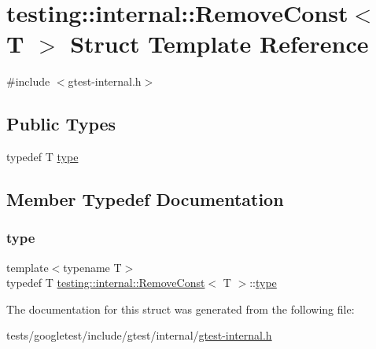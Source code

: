 \hypertarget{structtesting_1_1internal_1_1RemoveConst}{}\section{testing\+:\+:internal\+:\+:Remove\+Const$<$ T $>$ Struct Template Reference}
\label{structtesting_1_1internal_1_1RemoveConst}


{\ttfamily \#include $<$gtest-\/internal.\+h$>$}

\subsection*{Public Types}
\begin{DoxyCompactItemize}
\item 
typedef T \hyperlink{structtesting_1_1internal_1_1RemoveConst_a1be32027ea4edcc0d15abd59aba4a97f}{type}
\end{DoxyCompactItemize}


\subsection{Member Typedef Documentation}
\mbox{\label{structtesting_1_1internal_1_1RemoveConst_a1be32027ea4edcc0d15abd59aba4a97f}} 
\subsubsection{\texorpdfstring{type}{type}}
{\footnotesize\ttfamily template$<$typename T$>$ \\
typedef T \hyperlink{structtesting_1_1internal_1_1RemoveConst}{testing\+::internal\+::\+Remove\+Const}$<$ T $>$\+::\hyperlink{structtesting_1_1internal_1_1RemoveConst_a1be32027ea4edcc0d15abd59aba4a97f}{type}}



The documentation for this struct was generated from the following file\+:\begin{DoxyCompactItemize}
\item 
tests/googletest/include/gtest/internal/\hyperlink{gtest-internal_8h}{gtest-\/internal.\+h}\end{DoxyCompactItemize}

